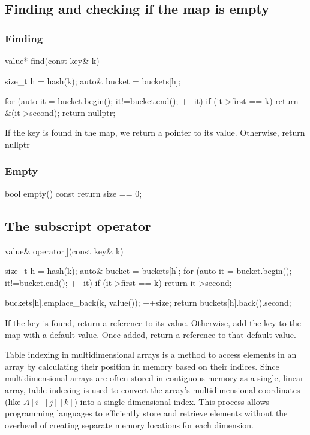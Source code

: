 \documentclass{report}
\begin{document}
 \bigbreak \noindent 
 \subsection{Finding and checking if the map is empty}
 \bigbreak \noindent 
 \subsubsection{Finding}
 \bigbreak \noindent 
 \begin{cppcode}
     value* find(const key& k) {
        size_t h = hash(k);
        auto& bucket = buckets[h];

        for (auto it = bucket.begin(); it!=bucket.end(); ++it) {
            if (it->first == k) {
                return &(it->second);
            }
        }
        return nullptr;
    }
 \end{cppcode}
 \bigbreak \noindent 
 If the key is found in the map, we return a pointer to its value. Otherwise, return nullptr

 \bigbreak \noindent 
 \subsubsection{Empty}
 \bigbreak \noindent 
 \begin{cppcode}
    bool empty() const {
        return size ==  0;
    }
 \end{cppcode}

 \bigbreak \noindent 
 \subsection{The subscript operator}
 \bigbreak \noindent 
 \begin{cppcode}
     value& operator[](const key& k) {
         size_t h = hash(k);
         auto& bucket = buckets[h];
         for (auto it = bucket.begin(); it!=bucket.end(); ++it) {
             if (it->first == k) return it->second;
         }

         buckets[h].emplace_back(k, value());
         ++size;
         return buckets[h].back().second;
     }
 \end{cppcode}
 \bigbreak \noindent 
 If the key is found, return a reference to its value. Otherwise, add the key to the map with a default value. Once added, return a reference to that default value.



\pagebreak 
{}
\bigbreak \noindent 
Table indexing in multidimensional arrays is a method to access elements in an array by calculating their position in memory based on their indices. Since multidimensional arrays are often stored in contiguous memory as a single, linear array, table indexing is used to convert the array's multidimensional coordinates (like $A[i][j][k]$) into a single-dimensional index. This process allows programming languages to efficiently store and retrieve elements without the overhead of creating separate memory locations for each dimension.
\bigbreak \noindent 
\end{document}

